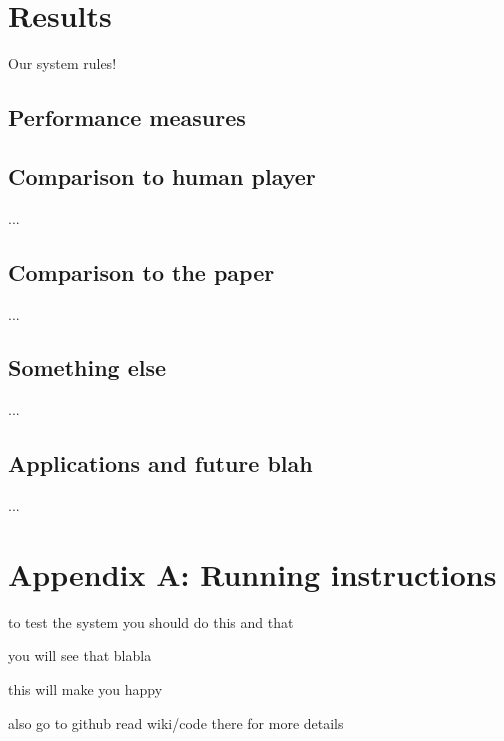 \documentclass[a4paper,12pt]{article}
\begin{document}
%
%
\pagebreak
\section{Results}
Our system rules!

\subsection{Performance measures}

\subsection{Comparison to human player}
...

\subsection{Comparison to the paper}
...

\subsection{Something else}
...

\subsection{Applications and future blah}
...



%
%
\pagebreak
\section*{Appendix A: Running instructions}
to test the system you should do this and that

you will see that blabla

this will make you happy

also go to github read wiki/code there for more details



%
%
\pagebreak
{}


\end{document}
